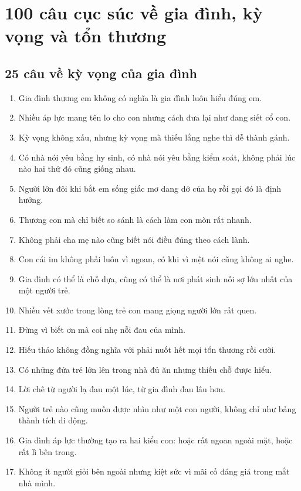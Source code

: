 \chapter{100 câu cục súc về gia đình, kỳ vọng và tổn thương}

\section{25 câu về kỳ vọng của gia đình}
\begin{enumerate}[leftmargin=*]
\item Gia đình thương em không có nghĩa là gia đình luôn hiểu đúng em.
\item Nhiều áp lực mang tên lo cho con nhưng cách đưa lại như đang siết cổ con.
\item Kỳ vọng không xấu, nhưng kỳ vọng mà thiếu lắng nghe thì dễ thành gánh.
\item Có nhà nói yêu bằng hy sinh, có nhà nói yêu bằng kiểm soát, không phải lúc nào hai thứ đó cũng giống nhau.
\item Người lớn đôi khi bắt em sống giấc mơ dang dở của họ rồi gọi đó là định hướng.
\item Thương con mà chỉ biết so sánh là cách làm con mòn rất nhanh.
\item Không phải cha mẹ nào cũng biết nói điều đúng theo cách lành.
\item Con cái im không phải luôn vì ngoan, có khi vì mệt nói cũng không ai nghe.
\item Gia đình có thể là chỗ dựa, cũng có thể là nơi phát sinh nỗi sợ lớn nhất của một người trẻ.
\item Nhiều vết xước trong lòng trẻ con mang giọng người lớn rất quen.
\item Đừng vì biết ơn mà coi nhẹ nỗi đau của mình.
\item Hiếu thảo không đồng nghĩa với phải nuốt hết mọi tổn thương rồi cười.
\item Có những đứa trẻ lớn lên trong nhà đủ ăn nhưng thiếu chỗ được hiểu.
\item Lời chê từ người lạ đau một lúc, từ gia đình đau lâu hơn.
\item Người trẻ nào cũng muốn được nhìn như một con người, không chỉ như bảng thành tích di động.
\item Gia đình áp lực thường tạo ra hai kiểu con: hoặc rất ngoan ngoài mặt, hoặc rất lì bên trong.
\item Không ít người giỏi bên ngoài nhưng kiệt sức vì mãi cố đáng giá trong mắt nhà mình.

\end{enumerate}
